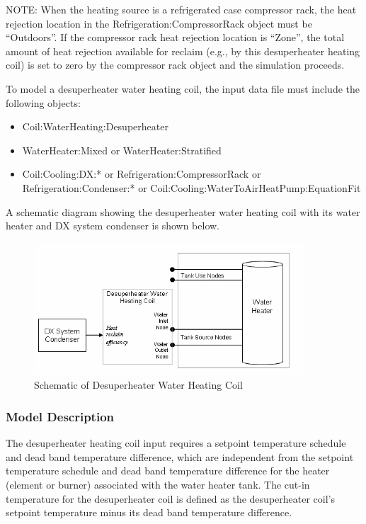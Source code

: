 NOTE: When the heating source is a refrigerated case compressor rack, the heat rejection location in the Refrigeration:CompressorRack object must be ``Outdoors''. If the compressor rack heat rejection location is ``Zone'', the total amount of heat rejection available for reclaim (e.g., by this desuperheater heating coil) is set to zero by the compressor rack object and the simulation proceeds.

To model a desuperheater water heating coil, the input data file must include the following objects:

\begin{itemize}
\item Coil:WaterHeating:Desuperheater
\item WaterHeater:Mixed or WaterHeater:Stratified
\item Coil:Cooling:DX:* or Refrigeration:CompressorRack or Refrigeration:Condenser:* or Coil:Cooling:WaterToAirHeatPump:EquationFit
\end{itemize}

A schematic diagram showing the desuperheater water heating coil with its water heater and DX system condenser is shown below.

\begin{figure}[hbtp] %
\centering
\includegraphics[width=0.9\textwidth, height=0.9\textheight, keepaspectratio=true]{media/image4049.png}
\caption{Schematic of Desuperheater Water Heating Coil \protect \label{fig:schematic-of-desuperheater-water-heating-coil}}
\end{figure}

\subsubsection{Model Description}\label{model-description-7}

The desuperheater heating coil input requires a setpoint temperature schedule and dead band temperature difference, which are independent from the setpoint temperature schedule and dead band temperature difference for the heater (element or burner) associated with the water heater tank. The cut-in temperature for the desuperheater coil is defined as the desuperheater coil's setpoint temperature minus its dead band temperature difference.

